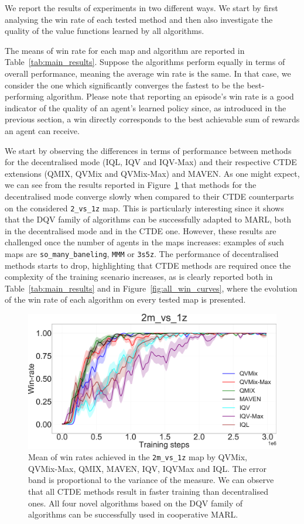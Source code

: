 We report the results of experiments in two different ways.
We start by first analysing the win rate of each tested method and then also investigate the quality of the value functions learned by all algorithms.

The means of win rate for each map and algorithm are reported in Table~\ref{tab:main_results}. 
Suppose the algorithms perform equally in terms of overall performance, meaning the average win rate is the same. 
In that case, we consider the one which significantly converges the fastest to be the best-performing algorithm.
Please note that reporting an episode's win rate is a good indicator of the quality of an agent's learned policy since, as introduced in the previous section, a win directly corresponds to the best achievable sum of rewards an agent can receive.

We start by observing the differences in terms of performance between methods for the decentralised mode (IQL, IQV and IQV-Max) and their respective CTDE extensions (QMIX, QVMix and QVMix-Max) and MAVEN.
As one might expect, we can see from the results reported in Figure~\ref{fig:ch4_2m1zwin} that methods for the decentralised mode converge slowly when compared to their CTDE counterparts on the considered \texttt{2\_vs\_1z} map.
This is particularly interesting since it shows that the DQV family of algorithms can be successfully adapted to MARL, both in the decentralised mode and in the CTDE one.
However, these results are challenged once the number of agents in the maps increases: examples of such maps are \texttt{so\_many\_baneling}, \texttt{MMM} or \texttt{3s5z}.
The performance of decentralised methods starts to drop, highlighting that CTDE methods are required once the complexity of the training scenario increases, as is clearly reported both in Table~\ref{tab:main_results} and in Figure~\ref{fig:all_win_curves}, where the evolution of the win rate of each algorithm on every tested map is presented.

\begin{figure}
\centering
\includegraphics[width=.8\linewidth]{tex_thesis/figures/ch4/2m1zall.pdf}
\caption{Mean of win rates achieved in the \texttt{2m\_vs\_1z} map by QVMix, QVMix-Max, QMIX, MAVEN, IQV, IQVMax and IQL. The error band is proportional to the variance of the measure. We can observe that all CTDE methods result in faster training than decentralised ones. All four novel algorithms based on the DQV family of algorithms can be successfully used in cooperative MARL.}
\label{fig:ch4_2m1zwin}
\end{figure}

